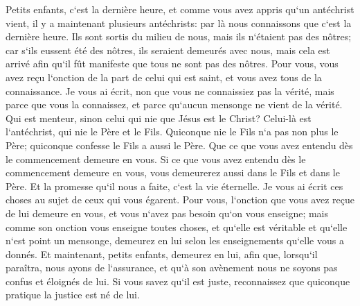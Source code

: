 \verse Petits enfants, c`est la dernière heure, et comme vous avez appris qu`un antéchrist vient, il y a maintenant plusieurs antéchrists: par là nous connaissons que c`est la dernière heure. 
\verse Ils sont sortis du milieu de nous, mais ils n`étaient pas des nôtres; car s`ils eussent été des nôtres, ils seraient demeurés avec nous, mais cela est arrivé afin qu`il fût manifeste que tous ne sont pas des nôtres. 
\verse Pour vous, vous avez reçu l`onction de la part de celui qui est saint, et vous avez tous de la connaissance. 
\verse Je vous ai écrit, non que vous ne connaissiez pas la vérité, mais parce que vous la connaissez, et parce qu`aucun mensonge ne vient de la vérité. 
\verse Qui est menteur, sinon celui qui nie que Jésus est le Christ? Celui-là est l`antéchrist, qui nie le Père et le Fils. 
\verse Quiconque nie le Fils n`a pas non plus le Père; quiconque confesse le Fils a aussi le Père. 
\verse Que ce que vous avez entendu dès le commencement demeure en vous. Si ce que vous avez entendu dès le commencement demeure en vous, vous demeurerez aussi dans le Fils et dans le Père. 
\verse Et la promesse qu`il nous a faite, c`est la vie éternelle. 
\verse Je vous ai écrit ces choses au sujet de ceux qui vous égarent. 
\verse Pour vous, l`onction que vous avez reçue de lui demeure en vous, et vous n`avez pas besoin qu`on vous enseigne; mais comme son onction vous enseigne toutes choses, et qu`elle est véritable et qu`elle n`est point un mensonge, demeurez en lui selon les enseignements qu`elle vous a donnés. 
\verse Et maintenant, petits enfants, demeurez en lui, afin que, lorsqu`il paraîtra, nous ayons de l`assurance, et qu`à son avènement nous ne soyons pas confus et éloignés de lui. 
\verse Si vous savez qu`il est juste, reconnaissez que quiconque pratique la justice est né de lui. 

